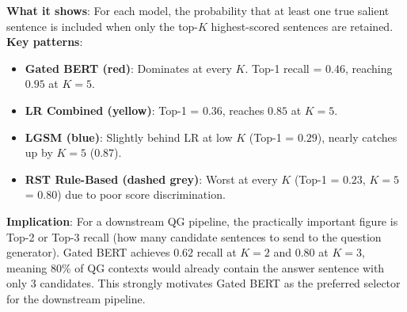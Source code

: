 \documentclass[11pt,a4paper]{article}
\begin{document}
\textbf{What it shows}: For each model, the probability that at least one true salient sentence is included when only the top-$K$ highest-scored sentences are retained.\\[4pt]
\textbf{Key patterns}:
\begin{itemize}
    \item \textbf{Gated BERT (red)}: Dominates at every $K$. Top-1 recall = $0.46$, reaching $0.95$ at $K=5$.
    \item \textbf{LR Combined (yellow)}: Top-1 = $0.36$, reaches $0.85$ at $K=5$.
    \item \textbf{LGSM (blue)}: Slightly behind LR at low $K$ (Top-1 = $0.29$), nearly catches up by $K=5$ ($0.87$).
    \item \textbf{RST Rule-Based (dashed grey)}: Worst at every $K$ (Top-1 = $0.23$, $K=5$ = $0.80$) due to poor score discrimination.
\end{itemize}
\textbf{Implication}: For a downstream QG pipeline, the practically important figure is Top-2 or Top-3 recall (how many candidate sentences to send to the question generator). Gated BERT achieves $0.62$ recall at $K=2$ and $0.80$ at $K=3$, meaning 80\% of QG contexts would already contain the answer sentence with only 3 candidates. This strongly motivates Gated BERT as the preferred selector for the downstream pipeline.
\end{document}
